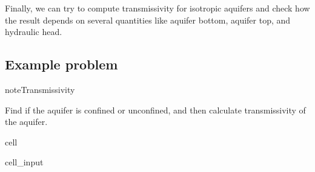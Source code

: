 \documentclass[letterpaper,10pt,english]{jupyterBook}
\begin{document}
\sphinxAtStartPar
Finally, we can try to compute transmissivity for isotropic aquifers and check how the result depends on several quantities like aquifer bottom, aquifer top, and hydraulic head.


\subsection{Example problem}
\label{\detokenize{content/flow/L8/18_wells:example-problem}}
\begin{sphinxadmonition}{note}{Transmissivity}

\sphinxAtStartPar
Find if the aquifer is confined or unconfined, and then calculate transmissivity of the aquifer.
\end{sphinxadmonition}

\begin{sphinxuseclass}{cell}\begin{sphinxVerbatimInput}

\begin{sphinxuseclass}{cell_input}
\begin{sphinxVerbatim}[commandchars=\\\{\}]
   
   
   
      

   
     
    

 


\end{sphinxVerbatim}
\end{sphinxuseclass}
\end{sphinxVerbatimInput}
\end{sphinxuseclass}
\end{document}
